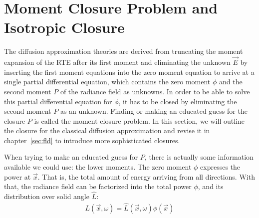 \section{Moment Closure Problem and Isotropic Closure}
\label{sec:moment_closure}

The diffusion approximation theories are derived from truncating the moment expansion of the RTE after its first moment and eliminating the unknown $\vec{E}$ by inserting the first moment equations into the zero moment equation to arrive at a single partial differential equation, which contains the zero moment $\phi$ and the second moment $P$ of the radiance field as unknowns. In order to be able to solve this partial differential equation for $\phi$, it has to be closed by eliminating the second moment $P$ as an unknown. Finding or making an educated guess for the closure $P$ is called the moment closure problem. In this section, we will outline the closure for the classical diffusion approximation and revise it in chapter~\ref{sec:fld} to introduce more sophisticated closures.

When trying to make an educated guess for $P$, there is actually some information available we could use: the lower moments. The zero moment $\phi$ expresses the power at $\vec{x}$. That is, the total amount of energy arriving from all directions. With that, the radiance field can be factorized into the total power $\phi$, and its distribution over solid angle $\hat{L}$:
\begin{align*}
L(\vec{x}, \omega) = \hat{L}(\vec{x}, \omega)\phi(\vec{x})
\end{align*}


